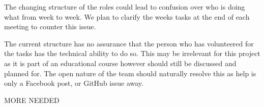 The changing structure of the roles could lead to confusion over who is
doing what from week to week. We plan to clarify the weeks tasks at the
end of each meeting to counter this issue.

The current structure has no assurance that the person who has volunteered
for the tasks has the technical ability to do so. This may be irrelevant
for this project as it is part of an educational course however should still
be discussed and planned for. The open nature of the team should naturally
resolve this as help is only a Facebook post, or GitHub issue away.

MORE NEEDED

